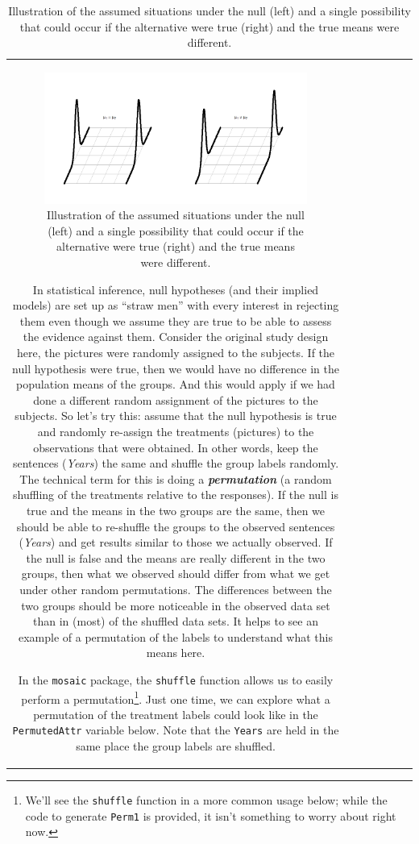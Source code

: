 \documentclass[]{book}
\let\rmarkdownfootnote\footnote%
\def\footnote{\protect\rmarkdownfootnote}
\theoremstyle{definition}
\theoremstyle{definition}
\theoremstyle{remark}
\begin{document}
\begin{longtable}[]{@{}ccccccc@{}}
\begin{minipage}[b]{0.10\columnwidth}
\begin{figure}
\centering
\includegraphics{chapter1_files/image015.png}
\caption{\label{fig:Figure2-7}Illustration of the assumed situations under the null
(left) and a single possibility that could occur if the alternative were
true (right) and the true means were different.}
\end{figure}

In statistical inference, null hypotheses (and their implied models) are
set up as ``straw men'' with every interest in rejecting them even
though we assume they are true to be able to assess the evidence against
them. Consider the original study design here, the pictures were
randomly assigned to the subjects. If the null hypothesis were true,
then we would have no difference in the population means of the groups.
And this would apply if we had done a different random assignment of the
pictures to the subjects. So let's try this: assume that the null
hypothesis is true and randomly re-assign the treatments (pictures) to
the observations that were obtained. In other words, keep the sentences
(\emph{Years}) the same and shuffle the group labels randomly. The
technical term for this is doing a \textbf{\emph{permutation}} (a random
shuffling of the treatments relative to the responses). If the null is
true and the means in the two groups are the same, then we should be
able to re-shuffle the groups to the observed sentences (\emph{Years})
and get results similar to those we actually observed. If the null is
false and the means are really different in the two groups, then what we
observed should differ from what we get under other random permutations.
The differences between the two groups should be more noticeable in the
observed data set than in (most) of the shuffled data sets. It helps to
see an example of a permutation of the labels to understand what this
means here.

In the \texttt{mosaic} package, the \texttt{shuffle} function allows us
to easily perform a permutation\footnote{We'll see the \texttt{shuffle}
  function in a more common usage below; while the code to generate
  \texttt{Perm1} is provided, it isn't something to worry about right
  now.}. Just one time, we can explore what a permutation of the
treatment labels could look like in the \texttt{PermutedAttr} variable
below. Note that the \texttt{Years} are held in the same place the group
labels are shuffled.


\end{minipage}
\end{longtable}
\end{document}
